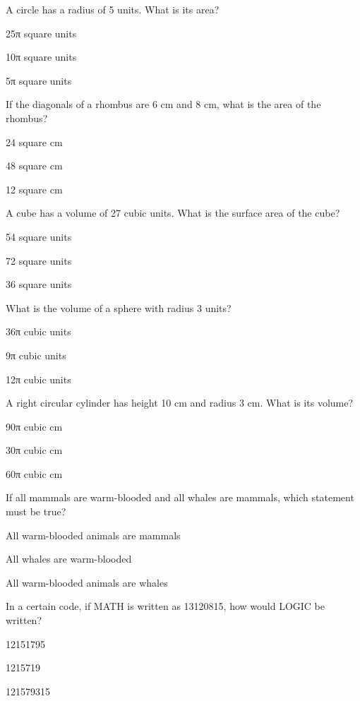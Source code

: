 \begin{enhancedmcq}{A circle has a radius of 5 units. What is its area?}
\item 25π square units
\item 10π square units
\item 5π square units

\end{enhancedmcq}
\begin{enhancedmcq}{If the diagonals of a rhombus are 6 cm and 8 cm, what is the area of the rhombus?}
\item 24 square cm
\item 48 square cm
\item 12 square cm

\end{enhancedmcq}
\begin{enhancedmcq}{A cube has a volume of 27 cubic units. What is the surface area of the cube?}
\item 54 square units
\item 72 square units
\item 36 square units

\end{enhancedmcq}
\begin{enhancedmcq}{What is the volume of a sphere with radius 3 units?}
\item 36π cubic units
\item 9π cubic units
\item 12π cubic units

\end{enhancedmcq}
\begin{enhancedmcq}{A right circular cylinder has height 10 cm and radius 3 cm. What is its volume?}
\item 90π cubic cm
\item 30π cubic cm
\item 60π cubic cm

\end{enhancedmcq}
\begin{enhancedmcq}{If all mammals are warm-blooded and all whales are mammals, which statement must be true?}
\item All warm-blooded animals are mammals
\item All whales are warm-blooded
\item All warm-blooded animals are whales

\end{enhancedmcq}
\begin{enhancedmcq}{In a certain code, if MATH is written as 13120815, how would LOGIC be written?}
\item 12151795
\item 1215719
\item 121579315

\end{enhancedmcq}
